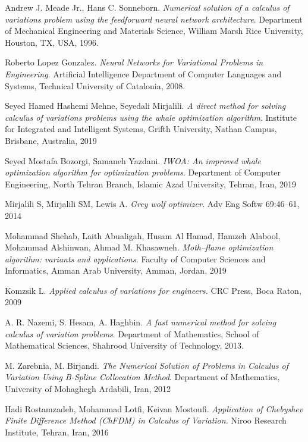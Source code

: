\documentclass[14pt,a4paper]{article}
\begin{document}
\begin{thebibliography}{100}

Andrew J. Meade Jr., Hans C. Sonneborn.
\textit{Numerical solution of a calculus of variations problem using the feedforward neural network architecture}. 
Department of Mechanical Engineering and Materials Science, William Marsh Rice University, Houston, TX, USA, 1996.

Roberto Lopez Gonzalez.
\textit{Neural Networks for Variational Problems in Engineering}. 
Artificial Intelligence Department of Computer Languages and Systems, Technical University of Catalonia, 2008.

Seyed Hamed Hashemi Mehne, Seyedali Mirjalili.
\textit{A direct method for solving calculus of variations problems using the whale optimization algorithm}. 
Institute for Integrated and Intelligent Systems, Grifth University, Nathan Campus, Brisbane, Australia, 2019

Seyed Mostafa Bozorgi, Samaneh Yazdani.
\textit{IWOA: An improved whale optimization algorithm for optimization problems}. 
Department of Computer Engineering, North Tehran Branch, Islamic Azad University, Tehran, Iran, 2019

Mirjalili S, Mirjalili SM, Lewis A.
\textit{Grey wolf optimizer.}
Adv Eng Softw 69:46–61, 2014

Mohammad Shehab, Laith Abualigah, Husam Al Hamad, Hamzeh Alabool, Mohammad Alshinwan, Ahmad M. Khasawneh.
\textit{Moth–flame optimization algorithm: variants and applications.}
Faculty of Computer Sciences and Informatics, Amman Arab
University, Amman, Jordan, 2019

Komzsik L.
\textit{Applied calculus of variations for engineers.}
CRC Press, Boca Raton, 2009

A. R. Nazemi, S. Hesam, A. Haghbin.
\textit{A fast numerical method for solving calculus of variation problems}. 
Department of Mathematics, School of Mathematical Sciences, Shahrood University of Technology, 2013.

M. Zarebnia, M. Birjandi.
\textit{The Numerical Solution of Problems in Calculus of Variation Using B-Spline Collocation Method}. 
Department of Mathematics, University of Mohaghegh Ardabili, Iran, 2012

Hadi Rostamzadeh, Mohammad Lotfi, Keivan Mostoufi.
\textit{Application of Chebyshev Finite Difference Method (ChFDM) in Calculus of Variation.}
Niroo Research Institute, Tehran, Iran, 2016

\end{thebibliography}
\end{document}
